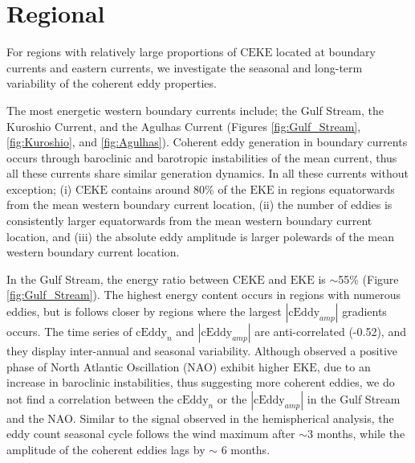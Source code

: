 \documentclass[draft,linenumbers]{agujournal2019}
\newcommand{\EKE}{\textrm{EKE}}
\newcommand{\CEKE}{\textrm{CEKE}}
\newcommand{\cEddy}{\textrm{cEddy}}
\begin{document}

	\section{Regional}
	\label{sec:CE_regional_stats}
	
	For regions with relatively large proportions of $\CEKE$ located at boundary currents and eastern currents, we investigate the seasonal and long-term variability of the coherent eddy properties.

	
	The most energetic western boundary currents include; the Gulf Stream, the Kuroshio Current, and the Agulhas Current (Figures \ref{fig:Gulf_Stream}, \ref{fig:Kuroshio}, and \ref{fig:Agulhas}). 
	Coherent eddy generation in boundary currents occurs through baroclinic and barotropic instabilities of the mean current, thus all these currents share similar generation dynamics. 
	In all these currents without exception; (i) $\CEKE$ contains around 80\% of the $\EKE$ in regions equatorwards from the mean western boundary current location, (ii) the number of eddies is consistently larger equatorwards from the mean western boundary current location, and (iii) the absolute eddy amplitude is larger polewards of the mean western boundary current location. 

	In the Gulf Stream, the energy ratio between $\CEKE$ and $\EKE$ is $\sim$55\% (Figure \ref{fig:Gulf_Stream}). 
	The highest energy content occurs in regions with numerous eddies, but is follows closer by regions where the largest $|\cEddy_{amp}|$ gradients occurs. 
	The time series of $\cEddy_{n}$ and $|\cEddy_{amp}|$ are anti-correlated (-0.52), and they display inter-annual and seasonal variability. 
	Although \citet{Chaudhuri_Oscillation_2009} observed a positive phase of North Atlantic Oscillation (NAO) exhibit higher $\EKE$, due to an increase in baroclinic instabilities, thus suggesting more coherent eddies, we do not find a correlation between the $\cEddy_{n}$ or the $|\cEddy_{amp}|$ in the Gulf Stream and the NAO. 
	Similar to the signal observed in the hemispherical analysis, the eddy count seasonal cycle follows the wind maximum after $\sim$3 months, while the amplitude of the coherent eddies lags by $\sim$ 6 months. 
\end{document}
